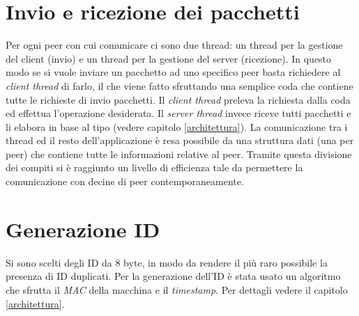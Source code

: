 \section{Invio e ricezione dei pacchetti}
Per ogni peer con cui comunicare ci sono due thread: un thread per la gestione del client (invio) e un thread per la gestione del server (ricezione).
In questo modo se si vuole inviare un pacchetto ad uno specifico peer basta richiedere al \textit{client thread} di farlo, il che viene fatto sfruttando una semplice coda che contiene tutte le richieste di invio pacchetti. Il \textit{client thread} preleva la richiesta dalla coda ed effettua l'operazione desiderata.
Il \textit{server thread} invece riceve tutti pacchetti e li elabora in base al tipo (vedere capitolo \ref{architettura}). La comunicazione tra i thread ed il resto dell'applicazione è resa possibile da una struttura dati (una per peer) che contiene tutte le informazioni relative al peer. Tramite questa divisione dei compiti si è raggiunto un livello di efficienza tale da permettere la comunicazione con decine di peer contemporaneamente.
\section{Generazione ID}
Si sono scelti degli ID da 8 byte, in modo da rendere il più raro possibile la presenza di ID duplicati. Per la generazione dell'ID è stata usato un algoritmo che sfrutta il \textit{MAC} della macchina e il \textit{timestamp}. Per dettagli vedere il capitolo \ref{architettura}.
